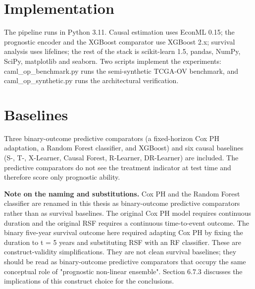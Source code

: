 \section{Implementation}\label{implementation}

The pipeline runs in Python 3.11. Causal estimation uses EconML 0.15; the prognostic encoder and the XGBoost comparator use XGBoost 2.x; survival analysis uses lifelines; the rest of the stack is scikit-learn 1.5, pandas, NumPy, SciPy, matplotlib and seaborn. Two scripts implement the experiments: caml\_op\_benchmark.py runs the semi-synthetic TCGA-OV benchmark, and caml\_op\_synthetic.py runs the architectural verification.

\section{Baselines}\label{baselines}

Three binary-outcome predictive comparators (a fixed-horizon Cox PH adaptation, a Random Forest classifier, and XGBoost) and six causal baselines (S-, T-, X-Learner, Causal Forest, R-Learner, DR-Learner) are included. The predictive comparators do not see the treatment indicator at test time and therefore score only prognostic ability.

\textbf{Note on the naming and substitutions.} Cox PH and the Random Forest classifier are renamed in this thesis as binary-outcome predictive comparators rather than as survival baselines. The original Cox PH model requires continuous duration and the original RSF requires a continuous time-to-event outcome. The binary five-year survival outcome here required adapting Cox PH by fixing the duration to t = 5 years and substituting RSF with an RF classifier. These are construct-validity simplifications. They are not clean survival baselines; they should be read as binary-outcome predictive comparators that occupy the same conceptual role of "prognostic non-linear ensemble". Section 6.7.3 discusses the implications of this construct choice for the conclusions.

\setcounter{table}{1}

